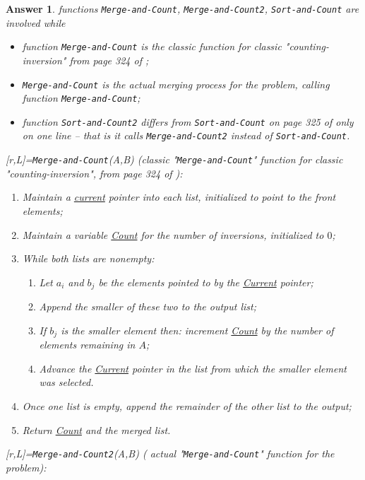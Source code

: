 \documentclass[11pt]{article}
\theoremstyle{numberplain}
\theoremstyle{nonumberplain}
\newtheorem{ans}{Answer}
\newcommand{\0}{{\mathbf{0}}}
\begin{document}
\begin{ans}  functions {\tt Merge-and-Count}, {\tt Merge-and-Count2}, {\tt Sort-and-Count} are involved while 
\begin{itemize}
\item function {\tt Merge-and-Count} is the classic function for classic "counting-inversion" from page 324 of \cite{jon2005algorithm};
\item {\tt Merge-and-Count} is the actual merging process for the problem, calling function {\tt Merge-and-Count};
\item function {\tt Sort-and-Count2} differs from {\tt Sort-and-Count} on page 325 of \cite{jon2005algorithm} only on one line -- that is it calls {\tt Merge-and-Count2} instead of {\tt Sort-and-Count}.
\end{itemize}
[r,L]={\tt Merge-and-Count}(A,B) (classic "{\tt Merge-and-Count}" function for classic "counting-inversion", from page 324 of \cite{jon2005algorithm}):
\begin{code}
\begin{enumerate}
\item Maintain a \underline{current} pointer into each list, initialized to point to the front elements;
\item Maintain a variable \underline{Count} for the number of inversions, initialized to $0$;
\item While both lists are nonempty: 
\begin{enumerate}
\item Let $a_i$ and $b_j$ be the elements pointed to by the \underline{Current} pointer;
\item Append the smaller of these two to the output list;
\item If $b_j$ is the smaller element then: increment \underline{Count} by the number of elements remaining in $A$;
\item Advance the \underline{Current} pointer in the list from which the smaller element was selected.
\end{enumerate}
\item Once one list is empty, append the remainder of the other list to the output;
\item Return \underline{Count} and the merged list.
\end{enumerate}
\end{code}
[r,L]={\tt Merge-and-Count2}(A,B) ( actual "{\tt Merge-and-Count}" function for the problem):
\begin{code}
\begin{enumerate}

\end{enumerate}
\end{code}
\end{ans}
\end{document}
